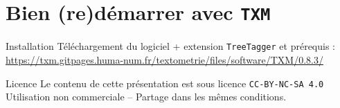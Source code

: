 \documentclass[xetex,xcolor={table,usenames,dvipsnames}]{beamer}
\begin{document}
\section{Bien (re)démarrer avec \texttt{TXM}}

\begin{frame}{Installation}
	Téléchargement du logiciel + extension \texttt{TreeTagger} et prérequis :\\ \url{https://txm.gitpages.huma-num.fr/textometrie/files/software/TXM/0.8.3/}
\end{frame}

\begin{frame}[allowframebreaks]
		\printbibliography
\end{frame}

\begin{frame}{Licence}
	\centering
	{\small Le contenu de cette présentation est sous licence \texttt{CC-BY-NC-SA 4.0}\\Utilisation non commerciale -- Partage dans les mêmes conditions.\\}
	\href{https://creativecommons.org/licenses/by-nc-sa/4.0/deed.fr}{\ccbyncsa}
\end{frame}
\end{document}
